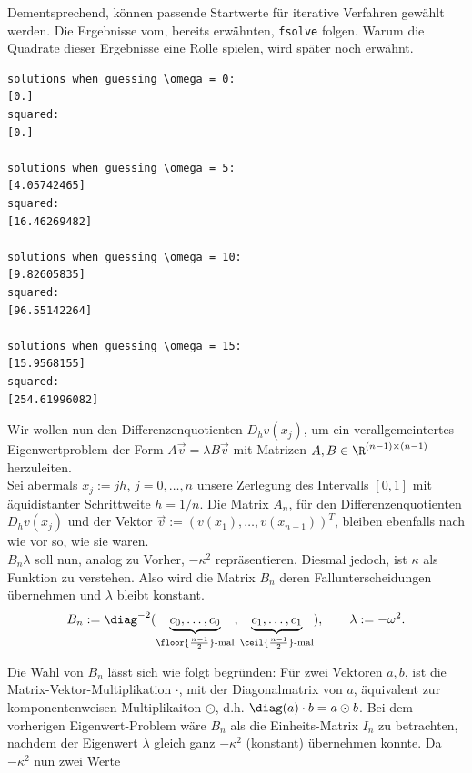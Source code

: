 Dementsprechend, können passende Startwerte für iterative Verfahren gewählt werden. Die Ergebnisse vom, bereits erwähnten, \verb|fsolve| folgen. Warum die Quadrate dieser Ergebnisse eine Rolle spielen, wird später noch erwähnt.

\begin{multicols}{2}
\begin{verbatim}
solutions when guessing \omega = 0:
[0.]
squared:
[0.]

solutions when guessing \omega = 5:
[4.05742465]
squared:
[16.46269482]

solutions when guessing \omega = 10:
[9.82605835]
squared:
[96.55142264]

solutions when guessing \omega = 15:
[15.9568155]
squared:
[254.61996082]
\end{verbatim}
\end{multicols}

Wir wollen nun den Differenzenquotienten $D_h v(x_j)$, um ein verallgemeintertes Eigenwertproblem der Form $A \vec v = \lambda B \vec v$ mit Matrizen $A, B \in \R^{(n-1) \times (n-1)}$ herzuleiten. \\

Sei abermals $x_j := jh$, $j = 0, \ldots, n$ unsere Zerlegung des Intervalls $[0, 1]$ mit äquidistanter Schrittweite $h = 1/n$. Die Matrix $A_n$, für den Differenzenquotienten $D_h v(x_j)$ und der Vektor $\vec v := (v(x_1), \ldots, v(x_{n-1}))^T$, bleiben ebenfalls nach wie vor so, wie sie waren. \\

$B_n \lambda$ soll nun, analog zu Vorher, $-\kappa^2$ repräsentieren. Diesmal jedoch, ist $\kappa$ als Funktion zu verstehen. Also wird die Matrix $B_n$ deren Fallunterscheidungen übernehmen und $\lambda$ bleibt konstant. \\

\begin{align*}
  B_n :=
  \diag^{-2}
  (
    \underbrace{c_0, \ldots, c_0}_{\floor{\frac{n-1}{2}} \text{-mal}},
    \underbrace{c_1, \ldots, c_1}_{\ceil {\frac{n-1}{2}} \text{-mal}}
  ), \qquad
  \lambda := -\omega^2.
\end{align*}

Die Wahl von $B_n$ lässt sich wie folgt begründen: Für zwei Vektoren $a, b$, ist die Matrix-Vektor-Multiplikation $\cdot$, mit der Diagonalmatrix von $a$, äquivalent zur komponentenweisen Multiplikaiton $\odot$, d.h. $\diag(a) \cdot b = a \odot b$. Bei dem vorherigen Eigenwert-Problem wäre $B_n$ als die Einheits-Matrix $I_n$ zu betrachten, nachdem der Eigenwert $\lambda$ gleich ganz $-\kappa^2$ (konstant) übernehmen konnte. Da $-\kappa^2$ nun zwei Werte

